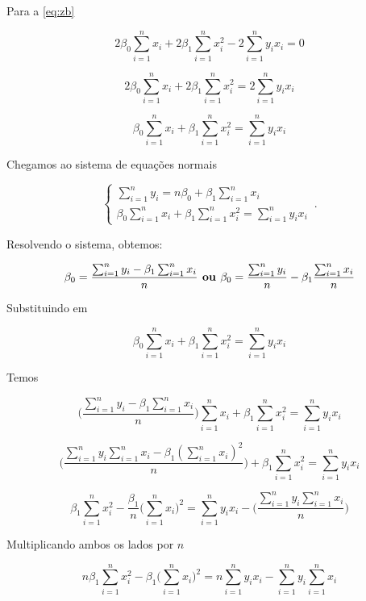 \noindent  Para a \autoref{eq:zb}

$$ 2 \beta_0 \sum_{i=1}^{n}  x_i + 2 \beta_1 \sum_{i=1}^{n}  x_i^{2} - 2 \sum_{i=1}^{n}  y_i x_i = 0 $$

$$ 2 \beta_0 \sum_{i=1}^{n}  x_i + 2 \beta_1 \sum_{i=1}^{n}  x_i^{2} = 2 \sum_{i=1}^{n}  y_i x_i$$

$$ \boxed{\beta_0 \sum_{i=1}^{n}  x_i + \beta_1 \sum_{i=1}^{n}  x_i^{2} = \sum_{i=1}^{n}  y_i x_i}$$


\noindent Chegamos ao sistema de equações normais

\begin{equation}
    \begin{cases}
      \sum_{i=1}^{n}  y_i = n \beta_0 + \beta_1 \sum_{i=1}^{n}  x_i\\
      \beta_0\sum_{i=1}^{n}  x_i + \beta_1 \sum_{i=1}^{n}  x_i^{2} = \sum_{i=1}^{n}  y_i x_i
    \end{cases}\,.
\end{equation}


\noindent Resolvendo o sistema, obtemos: 

\begin{equation}
\label{eq:eq43}
\beta_0 = \dfrac{\sum_{i=1}^{n}  y_i - \beta_1 \sum_{i=1}^{n}  x_i}{n}\\ \textbf{ ou }\\ \beta_0 = \dfrac{\sum_{i=1}^{n}  y_i}{n} - \beta_1 \dfrac{\sum_{i=1}^{n}  x_i}{n}
\end{equation}

\noindent Substituindo em

$$\beta_0\sum_{i=1}^{n}  x_i + \beta_1 \sum_{i=1}^{n}  x_i^{2} = \sum_{i=1}^{n}  y_i x_i $$

\noindent Temos

$$\bigg(\dfrac{\sum_{i=1}^{n}  y_i - \beta_1 \sum_{i=1}^{n}  x_i}{n}\bigg)\sum_{i=1}^{n}  x_i + \beta_1 \sum_{i=1}^{n}  x_i^{2} = \sum_{i=1}^{n}  y_i x_i $$

$$ \bigg(\dfrac{\sum_{i=1}^{n}  y_i \sum_{i=1}^{n}  x_i - \beta_1 (\sum_{i=1}^{n}  x_i)^2}{n}\bigg) +  \beta_1 \sum_{i=1}^{n}  x_i^{2} = \sum_{i=1}^{n}  y_i x_i$$

$$\beta_1  \sum_{i=1}^{n}  x_i^{2} - \dfrac{\beta_1}{n} \bigg(\sum_{i=1}^{n}  x_i \bigg)^2  = \sum_{i=1}^{n}  y_i x_i - \bigg( \dfrac{\sum_{i=1}^{n}  y_i \sum_{i=1}^{n}  x_i}{n}\bigg)$$

\noindent Multiplicando ambos os lados por $n$

$$n\beta_1  \sum_{i=1}^{n}  x_i^{2} - \beta_1 \bigg(\sum_{i=1}^{n}  x_i\bigg)^2  = n\sum_{i=1}^{n}  y_i x_i - \sum_{i=1}^{n}  y_i \sum_{i=1}^{n}  x_i$$


